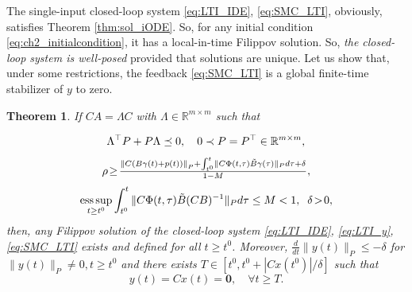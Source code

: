 \documentclass{article}
\newcommand{\R}{\mathbb{R}}
\newcommand{\zero}{\mathbf{0}}
\newtheorem{theorem}{Theorem}
\DeclareMathOperator*{\esssup}{ess\,sup}
\begin{document}
The single-input closed-loop system \eqref{eq:LTI_IDE}, \eqref{eq:SMC_LTI}, obviously, satisfies
Theorem \ref{thm:sol_iODE}. So, for any initial condition \eqref{eq:ch2_initialcondition}, it has a local-in-time  Filippov solution. 
So, \textit
{the closed-loop system is well-posed}  provided that solutions are unique. Let us show that, under some restrictions,
the feedback \eqref{eq:SMC_LTI} is a global
 finite-time stabilizer of $y$ to zero.
\begin{theorem}\label{thm:SMC_design_LTI_IDE}\itshape
	If $CA\!=\!\Lambda C$  with $\Lambda\!\in\! \R^{m\times m}$ such that \vspace{-1mm}

	\begin{equation}\label{eq:LMI}
		\Lambda^{\top}P+P\Lambda\preceq 0, \quad 0\prec P=P^{\top}\in \R^{m\times m},\vspace{-1mm}
	\end{equation}
	\begin{equation}\label{eq:con_rho}
		\rho \!\geq\!\tfrac{ \left\|C(B \gamma(t)+p(t))\right\|_{P}+\int^t_{t^0}\! \|C\Phi(t,\tau)\tilde B\gamma(\tau)\|_{P} d\tau+\delta}{1-M}, \vspace{-1mm}
	\end{equation}
	\begin{equation}\label{eq:con_Phi}
\small 	\esssup_{t\geq t^0}\int^t_{t^0}\|C\Phi(t,\tau)\tilde B(CB)^{-1}\|_{P} d\tau\leq M<1,\;\; \delta\!>\!0,\vspace{-1mm}
\end{equation}
	then, any  Filippov solution of the closed-loop system \eqref{eq:LTI_IDE}, \eqref{eq:LTI_y}, \eqref{eq:SMC_LTI} exists and defined for all $t\geq t^0$. Moreover, 
	$\frac{d}{dt} \|y(t)\|_{P}\leq -\delta$ for $\|y(t)\|_{P}\neq 0, t\geq t^0$ and 
	there exists
	$T\in \left[t^0,t^0+ |Cx(t^0)|/\delta\right]$ such that
	\begin{equation}
		y(t)=Cx(t)=\zero , \quad \forall t\geq T.
	\end{equation}
\end{theorem}  
\end{document}
